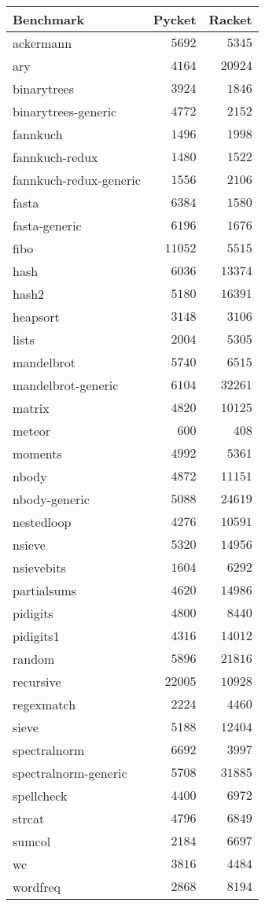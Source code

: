 \begin{table}[!tbp]
{\small
\begin{tabular}{l@{}r@{}r}
\toprule
\multicolumn{1}{l}{Benchmark}&\multicolumn{1}{c}{Pycket}&\multicolumn{1}{c}{Racket}\tabularnewline
\midrule
ackermann&$ 5692$&$ 5345$\tabularnewline
ary&$ 4164$&$20924$\tabularnewline
binarytrees&$ 3924$&$ 1846$\tabularnewline
binarytrees-generic&$ 4772$&$ 2152$\tabularnewline
fannkuch&$ 1496$&$ 1998$\tabularnewline
fannkuch-redux&$ 1480$&$ 1522$\tabularnewline
fannkuch-redux-generic&$ 1556$&$ 2106$\tabularnewline
fasta&$ 6384$&$ 1580$\tabularnewline
fasta-generic&$ 6196$&$ 1676$\tabularnewline
fibo&$11052$&$ 5515$\tabularnewline
hash&$ 6036$&$13374$\tabularnewline
hash2&$ 5180$&$16391$\tabularnewline
heapsort&$ 3148$&$ 3106$\tabularnewline
lists&$ 2004$&$ 5305$\tabularnewline
mandelbrot&$ 5740$&$ 6515$\tabularnewline
mandelbrot-generic&$ 6104$&$32261$\tabularnewline
matrix&$ 4820$&$10125$\tabularnewline
meteor&$  600$&$  408$\tabularnewline
moments&$ 4992$&$ 5361$\tabularnewline
nbody&$ 4872$&$11151$\tabularnewline
nbody-generic&$ 5088$&$24619$\tabularnewline
nestedloop&$ 4276$&$10591$\tabularnewline
nsieve&$ 5320$&$14956$\tabularnewline
nsievebits&$ 1604$&$ 6292$\tabularnewline
partialsums&$ 4620$&$14986$\tabularnewline
pidigits&$ 4800$&$ 8440$\tabularnewline
pidigits1&$ 4316$&$14012$\tabularnewline
random&$ 5896$&$21816$\tabularnewline
recursive&$22005$&$10928$\tabularnewline
regexmatch&$ 2224$&$ 4460$\tabularnewline
sieve&$ 5188$&$12404$\tabularnewline
spectralnorm&$ 6692$&$ 3997$\tabularnewline
spectralnorm-generic&$ 5708$&$31885$\tabularnewline
spellcheck&$ 4400$&$ 6972$\tabularnewline
strcat&$ 4796$&$ 6849$\tabularnewline
sumcol&$ 2184$&$ 6697$\tabularnewline
wc&$ 3816$&$ 4484$\tabularnewline
wordfreq&$ 2868$&$ 8194$\tabularnewline
\bottomrule
\end{tabular}}

\end{table}
